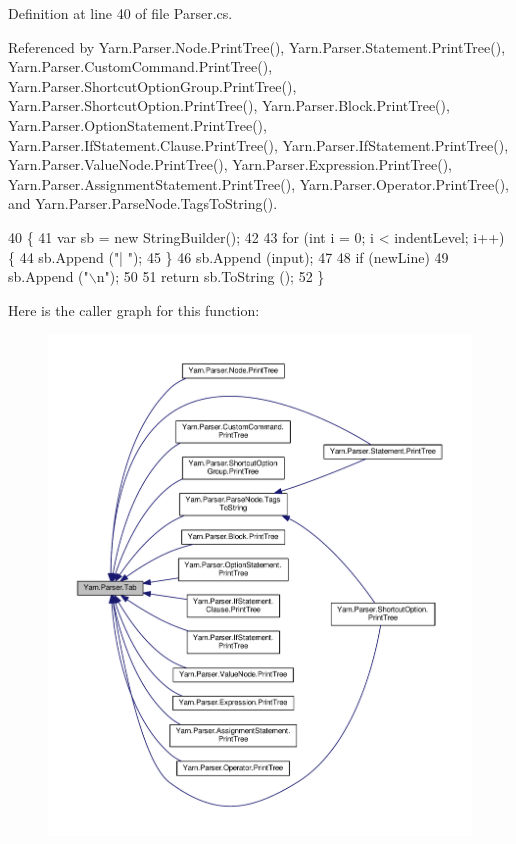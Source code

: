 Definition at line 40 of file Parser.\-cs.



Referenced by Yarn.\-Parser.\-Node.\-Print\-Tree(), Yarn.\-Parser.\-Statement.\-Print\-Tree(), Yarn.\-Parser.\-Custom\-Command.\-Print\-Tree(), Yarn.\-Parser.\-Shortcut\-Option\-Group.\-Print\-Tree(), Yarn.\-Parser.\-Shortcut\-Option.\-Print\-Tree(), Yarn.\-Parser.\-Block.\-Print\-Tree(), Yarn.\-Parser.\-Option\-Statement.\-Print\-Tree(), Yarn.\-Parser.\-If\-Statement.\-Clause.\-Print\-Tree(), Yarn.\-Parser.\-If\-Statement.\-Print\-Tree(), Yarn.\-Parser.\-Value\-Node.\-Print\-Tree(), Yarn.\-Parser.\-Expression.\-Print\-Tree(), Yarn.\-Parser.\-Assignment\-Statement.\-Print\-Tree(), Yarn.\-Parser.\-Operator.\-Print\-Tree(), and Yarn.\-Parser.\-Parse\-Node.\-Tags\-To\-String().


\begin{DoxyCode}
40                                                                                       \{
41             var sb = \textcolor{keyword}{new} StringBuilder();
42 
43             \textcolor{keywordflow}{for} (\textcolor{keywordtype}{int} i = 0; i < indentLevel; i++) \{
44                 sb.Append (\textcolor{stringliteral}{"| "});
45             \}
46             sb.Append (input);
47 
48             \textcolor{keywordflow}{if} (newLine)
49                 sb.Append (\textcolor{stringliteral}{"\(\backslash\)n"});
50 
51             \textcolor{keywordflow}{return} sb.ToString ();
52         \}
\end{DoxyCode}


Here is the caller graph for this function\-:
\nopagebreak
\begin{figure}[H]
\begin{center}
\leavevmode
\includegraphics[width=350pt]{a00143_aa8fa36b46de12a1c561d77b99c4b9ae3_icgraph}
\end{center}
\end{figure}




